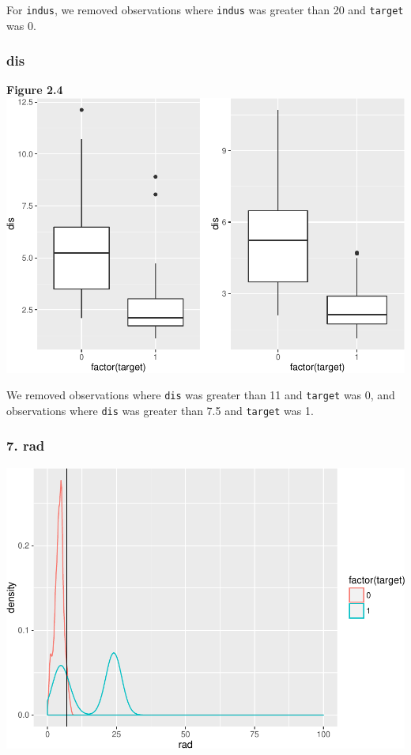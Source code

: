 \documentclass[]{article}
\begin{document}
For \texttt{indus}, we removed observations where \texttt{indus} was
greater than 20 and \texttt{target} was 0.

\subsubsection{dis}\label{dis}

\textbf{Figure
2.4}\\\includegraphics{HW3_Final_files/figure-latex/unnamed-chunk-7-1.pdf}

We removed observations where \texttt{dis} was greater than 11 and
\texttt{target} was 0, and observations where \texttt{dis} was greater
than 7.5 and \texttt{target} was 1.

\subsubsection{7. rad}\label{rad}

\includegraphics{HW3_Final_files/figure-latex/unnamed-chunk-8-1.pdf}
\end{document}
